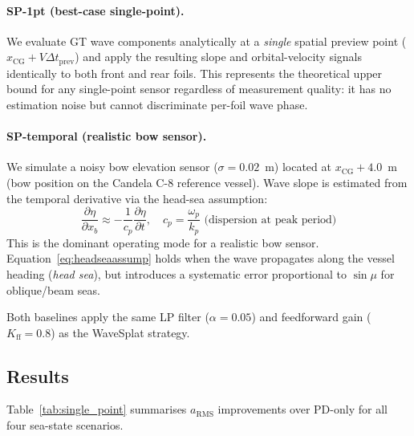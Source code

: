 \documentclass[review]{elsarticle}
\begin{document}
\paragraph{SP-1pt (best-case single-point).}
We evaluate GT wave components analytically at a \emph{single} spatial
preview point ($x_\text{CG} + V \Delta t_\text{prev}$) and apply the
resulting slope and orbital-velocity signals identically to both front
and rear foils.  This represents the theoretical upper bound for any
single-point sensor regardless of measurement quality: it has no
estimation noise but cannot discriminate per-foil wave phase.

\paragraph{SP-temporal (realistic bow sensor).}
We simulate a noisy bow elevation sensor ($\sigma = 0.02$~m) located
at $x_\text{CG} + 4.0$~m (bow position on the Candela C-8 reference
vessel).  Wave slope is estimated from the temporal derivative via the
head-sea assumption:
\begin{equation}
  \frac{\partial\eta}{\partial x_b} \approx -\frac{1}{c_p} \frac{\partial\eta}{\partial t},
  \quad c_p = \frac{\omega_p}{k_p} \text{ (dispersion at peak period)}
  \label{eq:headseaassump}
\end{equation}
This is the dominant operating mode for a realistic bow sensor.
Equation~\eqref{eq:headseaassump} holds when the wave propagates along
the vessel heading (\emph{head sea}), but introduces a systematic error
proportional to $\sin\mu$ for oblique/beam seas.

Both baselines apply the same LP filter ($\alpha = 0.05$) and
feedforward gain ($K_\text{ff} = 0.8$) as the WaveSplat strategy.

\subsection{Results}

Table~\ref{tab:single_point} summarises $a_\text{RMS}$ improvements
over PD-only for all four sea-state scenarios.
\end{document}
